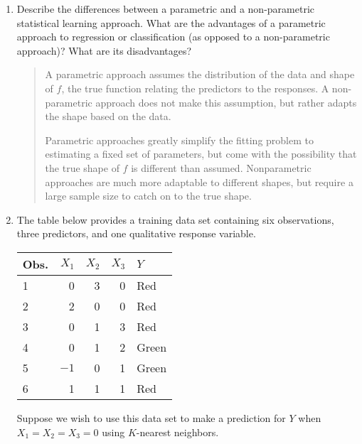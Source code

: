 \documentclass[11pt]{article}
\newenvironment{answer}{
\begin{quote}}{
\end{quote}}
\begin{document}
\begin{enumerate}
  \item Describe the differences between a parametric and a non-parametric
    statistical learning approach. What are the advantages of a
    parametric approach to regression or classification (as opposed
    to a non-parametric approach)? What are its disadvantages?
    \begin{answer}
      A parametric approach assumes the distribution of the data and
      shape of $f$, the true function relating the predictors to the
      responses. A non-parametric approach does not make this
      assumption, but rather adapts the shape based on the data.

      Parametric approaches greatly simplify the fitting problem to
      estimating a fixed set of parameters, but come with the
      possibility that the true shape of $f$ is different than
      assumed. Nonparametric approaches are much more adaptable to
      different shapes, but require a large sample size to catch on
      to the true shape.
    \end{answer}

  \item The table below provides a training data set containing six
    observations, three predictors, and one qualitative response variable.
    \begin{center}
      \begin{tabular}{l|rrrl}
        \hline
        Obs. & $X_1$ & $X_2$ & $X_3$ & $Y$ \\
        \hline
        1 & 0 & 3 & 0 & Red \\
        2 & 2 & 0 & 0 & Red \\
        3 & 0 & 1 & 3 & Red \\
        4 & 0 & 1 & 2 & Green \\
        5 & $-1$ & 0 & 1 & Green \\
        6 & 1 & 1 & 1 & Red \\
        \hline
      \end{tabular}
    \end{center}

    Suppose we wish to use this data set to make a prediction for $Y$
    when $X_1 = X_2 = X_3 = 0$ using $K$-nearest neighbors.


\end{enumerate}
\end{document}
